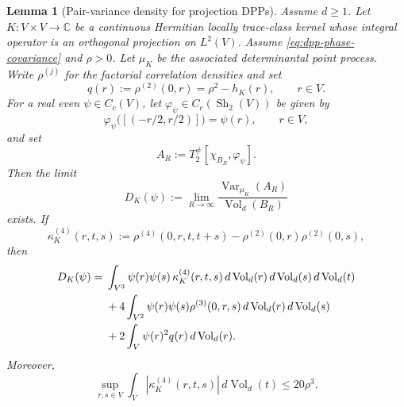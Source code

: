 \documentclass[11pt,reqno,a4paper]{amsart}
\numberwithin{equation}{section}
\theoremstyle{compact}
\newtheorem{lemma}[lemma]{Lemma}
\theoremstyle{definition}
\theoremstyle{definition}
\newcommand{\Var}{\operatorname{Var}}
\newcommand{\Vol}{\operatorname{Vol}}
\newcommand{\Sh}{\operatorname{Sh}}
\begin{document}
\begin{lemma}[Pair-variance density for projection DPPs]
\label{lem:dpp-pair-variance-density}
Assume $d\geq1$.  Let $K:V\times V\to\mathbb C$ be a continuous Hermitian locally trace-class
kernel whose integral operator is an orthogonal projection on $L^2(V)$.
Assume \eqref{eq:dpp-phase-covariance} and $\rho>0$.
Let $\mu_K$ be the associated determinantal point process.  Write $\rho^{(j)}$ for the factorial correlation densities and set
\begin{equation}\label{eq:dpp-pair-density}
  q(r):=\rho^{(2)}(0,r)=\rho^2-h_K(r),
  \qquad r\in V.
\end{equation}
For a real even $\psi\in C_c(V)$, let $\varphi_\psi\in C_c(\Sh_2(V))$ be given by
\begin{equation}\label{eq:dpp-pair-shape-even-lift}
  \varphi_\psi\big([(-r/2,r/2)]\big)=\psi(r),
  \qquad r\in V,
\end{equation}
and set
\begin{equation}\label{eq:dpp-pair-observable}
  A_R:=T_2^{\neq}[\chi_{B_R},\varphi_\psi].
\end{equation}
Then the limit
\begin{equation}\label{eq:dpp-pair-density-limit-short}
  D_K(\psi):=\lim_{R\to\infty}
  \frac{\Var_{\mu_K}(A_R)}{\Vol_d(B_R)}
\end{equation}
exists.  If
\begin{equation}\label{eq:dpp-connected-four-point}
  \kappa^{(4)}_K(r,t,s)
  :=\rho^{(4)}(0,r,t,t+s)
    -\rho^{(2)}(0,r)\rho^{(2)}(0,s),
\end{equation}
then
\begin{align}\label{eq:dpp-general-pair-variance-limit}
  D_K(\psi)
  ={}&\int_{V^3}\psi(r)\psi(s)\,
       \kappa^{(4)}_K(r,t,s)\,
       d\Vol_d(r)\,d\Vol_d(s)\,d\Vol_d(t)\notag\\
   &+4\int_{V^2}\psi(r)\psi(s)\rho^{(3)}(0,r,s)\,
       d\Vol_d(r)\,d\Vol_d(s)\notag\\
   &+2\int_V \psi(r)^2q(r)\,d\Vol_d(r).
\end{align}
Moreover,
\begin{equation}\label{eq:dpp-connected-four-point-bound}
  \sup_{r,s\in V}\int_V
       |\kappa^{(4)}_K(r,t,s)|\,d\Vol_d(t)
  \leq20\rho^3.
\end{equation}
\end{lemma}
\end{document}
